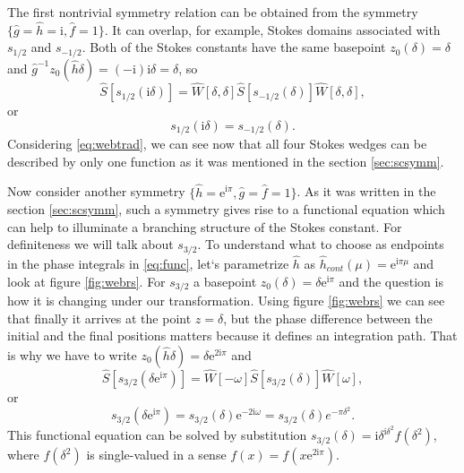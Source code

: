 \documentclass[atmp]{ipart_v1}
\def\rme{\mathrm{e}}
\def\rmi{\mathrm{i}}
\def\f{\hat{f}}
\def\g{\hat{g}}
\def\h{\hat{h}}
\def\S{\widehat{S}}
\def\W{\widehat{W}}
\def\unity{1}
\def\w{\omega}
\newcommand\eref[1]{\eqref{#1}}
\newcommand\fref[1]{figure \ref{#1}}
\newcommand\sref[1]{section \ref{#1}}
\begin{document}
The first nontrivial symmetry relation can be obtained from the symmetry 
$\{\g=\h=\rmi,\f=\unity\}$. It can overlap, for example, Stokes domains associated with
$s_{1/2}$ and $s_{-1/2}$. Both of the Stokes constants have the same 
basepoint $z_0(\delta)=\delta$ and $\g^{-1}z_0(\h\delta)=(-\rmi)\rmi\delta=\delta$, so
\begin{equation}
\S \left[ s_{1/2}(\rmi \delta) \right] = 
\W \left[ \delta, \delta \right]
\S \left[ s_{-1/2}(\delta) \right]
\W \left[ \delta, \delta \right],
\end{equation}
or
\begin{equation}
s_{1/2}(\rmi \delta) = s_{-1/2}(\delta).
\label{eq:websym_1}
\end{equation}
Considering \eref{eq:webtrad}, we can 
see now that all four Stokes wedges can be described by only one function as it
was mentioned in the \sref{sec:scsymm}. 

Now consider another symmetry $\{\h=\rme^{\rmi\pi},\g=\f=\unity\}$. 
As it was written in the \sref{sec:scsymm}, such a symmetry gives rise to a functional 
equation which can help to illuminate a branching structure of the Stokes constant. 
For definiteness we will talk about $s_{3/2}$. To understand what to choose as endpoints 
in the phase integrals in \eref{eq:func}, let`s parametrize $\h$ as $\h_{cont}(\mu)=\rme^{\rmi\pi\mu}$ 
and look at \fref{fig:webrs}. For $s_{3/2}$ a basepoint $z_0(\delta)=\delta \rme^{\rmi\pi}$ 
and the question is how it is changing under our transformation. Using \fref{fig:webrs} 
we can see that finally it arrives at the point $z=\delta$, but the phase difference between the
initial and the final positions matters because it defines an integration path.
That is why we have to write $z_0(\h\delta)=\delta \rme^{2\rmi\pi}$ and
\begin{equation}
\S \left[ s_{3/2}(\delta \rme^{\rmi\pi}) \right] = 
\W \left[- \w \right]
\S \left[ s_{3/2} (\delta) \right]
\W \left[  \w \right],
\end{equation}
or
\begin{equation}
s_{3/2}(\delta \rme^{\rmi\pi})=s_{3/2}(\delta)\rme^{-2\rmi \w}=s_{3/2}(\delta)e^{-\pi\delta^2}.
\label{eq:websym_2}
\end{equation}
This functional equation can be solved by substitution 
$s_{3/2}(\delta)=\rmi\delta^{\rmi\delta^2}f(\delta^2)$, where $f(\delta^2)$
is single-valued in a sense $f(x)=f(x \rme^{2\rmi\pi})$.
\end{document}
